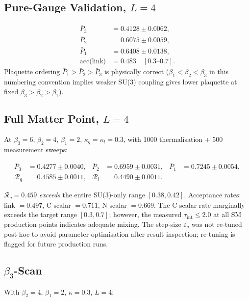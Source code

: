 \documentclass[12pt,a4paper]{article}
\newcommand{\R}{\mathcal{R}}           %
\theoremstyle{plain}
\theoremstyle{definition}
\theoremstyle{remark}
\begin{document}
\subsection{Pure-Gauge Validation, $L=4$}

\begin{align*}
  \bar{P}_3 &= 0.4128 \pm 0.0062, \\
  \bar{P}_2 &= 0.6075 \pm 0.0059, \\
  \bar{P}_1 &= 0.6408 \pm 0.0138, \\
  \text{acc(link)} &= 0.483 \quad [0.3\text{--}0.7].
\end{align*}
Plaquette ordering $\bar{P}_1>\bar{P}_2>\bar{P}_3$ is physically correct
($\beta_1<\beta_2<\beta_3$ in this numbering convention implies weaker SU(3) coupling
gives lower plaquette at fixed $\beta_3>\beta_2>\beta_1$).

\subsection{Full Matter Point, $L=4$}

At $\beta_3=6$, $\beta_2=4$, $\beta_1=2$, $\kappa_q=\kappa_l=0.3$,
with 1000 thermalisation + 500 measurement sweeps:

\begin{align*}
  \bar{P}_3 &= 0.4277\pm0.0040, &
  \bar{P}_2 &= 0.6959\pm0.0031, &
  \bar{P}_1 &= 0.7245\pm0.0054, \\
  \R_q &= 0.4585\pm0.0011, &
  \R_l &= 0.4490\pm0.0011. &
\end{align*}

$\R_q=0.459$ \emph{exceeds} the entire SU(3)-only range $[0.38,0.42]$.
Acceptance rates: link $=0.497$, C-scalar $=0.711$, N-scalar $=0.669$.
The C-scalar rate marginally exceeds the target range $[0.3,0.7]$; however,
the measured $\tau_\text{int}\le2.0$ at all SM production points indicates
adequate mixing. The step-size $\varepsilon_q$ was not re-tuned post-hoc
to avoid parameter optimisation after result inspection; re-tuning is
flagged for future production runs.

\subsection{$\beta_3$-Scan}

With $\beta_2=4$, $\beta_1=2$, $\kappa=0.3$, $L=4$:
\end{document}
